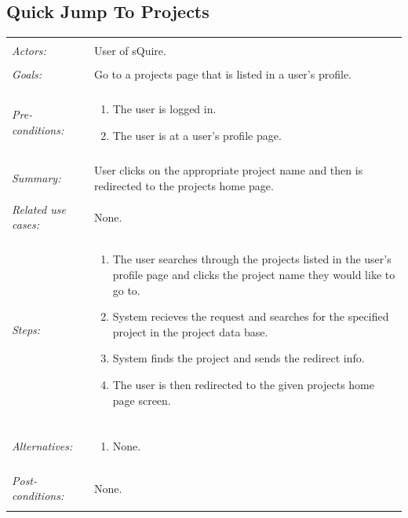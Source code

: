 \documentclass[11pt]{report}
\begin{document}
\subsection{Quick Jump To Projects}
\begin{tabular}{ p{2cm} p{12cm} }
 \hline
 \\
 \textit{Actors:} & User of sQuire. \\ 
 \\
 \textit{Goals:} & Go to a projects page that is listed in a user's profile. \\
 \\
 \textit{Pre-conditions:} & \begin{enumerate}
  \item The user is logged in.
  \item The user is at a user's profile page.
 \end{enumerate} \\
 \\
 \textit{Summary:} & User clicks on the appropriate project name and then is redirected to the projects home page.\\ 
 \\
 \textit{Related use cases:} & None. \\ 
 \\
 \textit{Steps:} & \begin{enumerate}
  \item The user searches through the projects listed in the user's profile page and clicks the project name they would like to go to.
  \item System recieves the request and searches for the specified project in the project data base.
  \item System finds the project and sends the redirect info.
  \item The user is then redirected to the given projects home page screen.
 \end{enumerate} \\
 \\
 \textit{Alternatives:} & \begin{enumerate} 
  \item None.
 \end{enumerate} \\
 \\
 \textit{Post-conditions:} & None. \\
 \\
\hline
\end{tabular}
\end{document}
